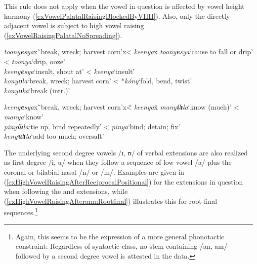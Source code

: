 This rule does not apply when the vowel in question is affected by vowel height harmony (\ref{exVowelPalatalRaisingBlockedByVHH}). Also, only the directly adjacent vowel is subject to high vowel raising (\ref{exVowelRaisingPalatalNoSpreading}).

\begin{exe}
\ex \label{exVowelPalatalRaisingBlockedByVHH} 
\begin{tabbing}
\textit{toony\textbf{e}sya}x\=`break, wreck; harvest corn'x\=< \textit{keenya}x\=\kill%
\textit{toony\textbf{e}sya}\>`cause to fall or drip'\> < \textit{toonya}\>`drip, ooze'\\ 
\textit{keeny\textbf{e}sya}\>`insult, shout at'\> < \textit{keenya}\>`insult'\\
\textit{kony\textbf{o}la}\>`break, wreck; harvest corn'\> < *\textit{kóny}\>`fold, bend, twist'\\
\textit{kony\textbf{o}ka}\>`break (intr.)'
\end{tabbing}
\ex\label{exVowelRaisingPalatalNoSpreading}
\begin{tabbing}
\textit{keeny\textbf{e}sya}x\=`break, wreck; harvest corn'x\=< \textit{keenya}x\=\kill%
\textit{many\textbf{i}l\textbf{ɪ}la}\>`know (much)'\> < \textit{manya}\>`know'\\
\textit{piny\textbf{i}l\textbf{ɪ}la}\>`tie up, bind repeatedly'\> < \textit{pinya}\>`bind; detain; fix'\\
\textit{keny\textbf{u}l\textbf{ɪ}la}\>`add too much; oversalt'
\end{tabbing}
\end{exe}

The underlying second degree vowels /ɪ, ʊ/ of verbal extensions are also realized as first degree /i, u/ when they follow a sequence of low vowel /a/ plus the coronal or bilabial nasal /n/ or /m/. Examples are given in (\ref{exHighVowelRaisingAfterReciprocalPositional}) for the extensions in question when following the  and  extensions, while (\ref{exHighVowelRaisingAfteranmRootfinal}) illustrates this for root-final sequences.\footnote{Again, this seems to be the expression of a more general phonotactic constraint: Regardless of syntactic class, no stem containing /an, am/ followed by a second degree vowel is attested in the data.}

